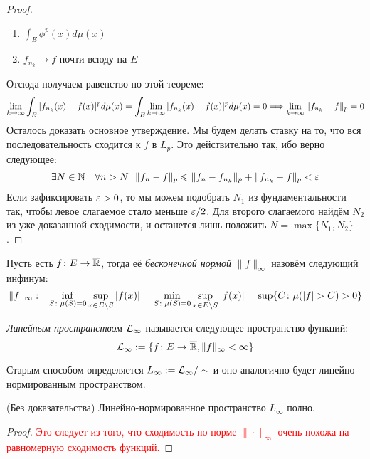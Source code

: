 \begin{proof}
\begin{enumerate}
		\item $\int_E \phi^p(x)d\mu(x)$
		
		\item $f_{n_k} \to f$ почти всюду на $E$
	\end{enumerate}
	Отсюда получаем равенство по этой теореме:
	\[
		\lim_{k \to \infty} \int_E |f_{n_k}(x) - f(x)|^pd\mu(x) = \int_E \lim_{k \to \infty} |f_{n_k}(x) - f(x)|^pd\mu(x) = 0 \Longrightarrow \lim_{k \to \infty} \|f_{n_k} - f\|_p = 0
	\]
	Осталось доказать основное утверждение. Мы будем делать ставку на то, что вся последовательность сходится к $f$ в $L_p$. Это действительно так, ибо верно следующее:
	\[
		\exists N \in \mathbb{N} \ \big|\  \forall n > N\ \ \|f_n - f\|_p \leqslant \|f_n - f_{n_k}\|_p + \|f_{n_k} - f\|_p < \varepsilon
	\]
	Если зафиксировать $\varepsilon > 0$, то мы можем подобрать $N_1$ из фундаментальности так, чтобы левое слагаемое стало меньше $\varepsilon / 2$. Для второго слагаемого найдём $N_2$ из уже доказанной сходимости, и останется лишь положить $N = \max\{N_1, N_2\}$.
\end{proof}

\begin{definition}
	Пусть есть $f \colon E \to \overline{\mathbb{R}}$, тогда её \textit{бесконечной нормой} $\|f\|_\infty$ назовём следующий инфинум:
	\[
		\|f\|_\infty := \inf_{S \colon \mu(S) = 0} \sup_{x \in E \backslash S} |f(x)| = \min_{S \colon \mu(S) = 0} \sup_{x \in E \backslash S} |f(x)| = \sup \{C \colon \mu(|f| > C) > 0\}
	\]
\end{definition}

\begin{definition}
	\textit{Линейным пространством $\mathcal{L}_\infty$} называется следующее пространство функций:
	\[
		\mathcal{L}_\infty := \{f \colon E \to \overline{\mathbb{R}}, \|f\|_\infty < \infty\}
	\]
\end{definition}

\begin{note}
	Старым способом определяется $L_\infty := \mathcal{L}_\infty / \sim$ и оно аналогично будет линейно нормированным пространством.
\end{note}

\begin{theorem} (Без доказательства)
	Линейно-нормированное пространство $L_\infty$ полно.
\end{theorem}

\begin{proof}
	\textcolor{red}{Это следует из того, что сходимость по норме $\|\cdot\|_\infty$ очень похожа на равномерную сходимость функций.}
\end{proof}

